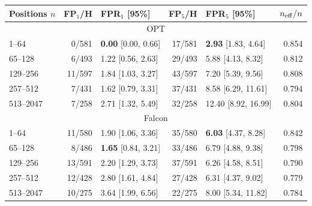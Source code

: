 \begin{tabular}{@{}lrlrlr@{}}
\toprule
Positions $n$ & FP$_1$/H & FPR$_1$ [95\%] & FP$_5$/H & FPR$_5$ [95\%] & $n_{\rm eff}/n$ \\
\midrule
\multicolumn{6}{c}{OPT} \\
1--64 & 0/581 & \textbf{0.00} [0.00, 0.66] & 17/581 & \textbf{2.93} [1.83, 4.64] & 0.854 \\
65--128 & 6/493 & 1.22 [0.56, 2.63] & 29/493 & 5.88 [4.13, 8.32] & 0.812 \\
129--256 & 11/597 & 1.84 [1.03, 3.27] & 43/597 & 7.20 [5.39, 9.56] & 0.808 \\
257--512 & 7/431 & 1.62 [0.79, 3.31] & 37/431 & 8.58 [6.29, 11.61] & 0.794 \\
513--2047 & 7/258 & 2.71 [1.32, 5.49] & 32/258 & 12.40 [8.92, 16.99] & 0.804 \\
\midrule
\multicolumn{6}{c}{Falcon} \\
1--64 & 11/580 & 1.90 [1.06, 3.36] & 35/580 & \textbf{6.03} [4.37, 8.28] & 0.842 \\
65--128 & 8/486 & \textbf{1.65} [0.84, 3.21] & 33/486 & 6.79 [4.88, 9.38] & 0.798 \\
129--256 & 13/591 & 2.20 [1.29, 3.73] & 37/591 & 6.26 [4.58, 8.51] & 0.790 \\
257--512 & 12/428 & 2.80 [1.61, 4.84] & 27/428 & 6.31 [4.37, 9.02] & 0.779 \\
513--2047 & 10/275 & 3.64 [1.99, 6.56] & 22/275 & 8.00 [5.34, 11.82] & 0.784 \\
\bottomrule
\end{tabular}

